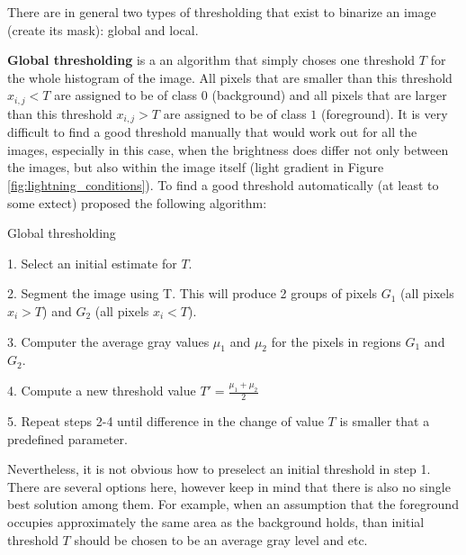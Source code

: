 There are in general two types of thresholding that exist to binarize an image (create its mask): global and local.

\textbf{Global thresholding} is a an algorithm that simply choses one threshold $T$ for the whole histogram of the image. All pixels that are smaller than this threshold $x_{i,j} < T$ are assigned to be of class $0$ (background) and all pixels that are larger than this threshold $x_{i,j} > T$ are assigned to be of class $1$ (foreground). It is very difficult to find a good threshold manually that would work out for all the images, especially in this case, when the brightness does differ not only between the images, but also within the image itself (light gradient in Figure \ref{fig:lightning_conditions}). To find a good threshold automatically (at least to some extect) \cite{digital_image_book} proposed the following algorithm:

\begin{algorithm}[H]
  \caption{Global thresholding}
  \begin{algorithmic}
    \item 1. Select an initial estimate for $T$.
    \item 2. Segment the image using T. This will produce 2 groups of pixels $G_1$ (all pixels $x_i > T$) and $G_2$ (all pixels $x_i < T$).  
    \item 3. Computer the average gray values $\mu_1$ and $\mu_2$ for the pixels in  regions $G_1$ and $G_2$.
    \item 4. Compute a new threshold value 
        $T' = \frac{\mu_1 + \mu_2}{2}$
    \item 5. Repeat steps 2-4 until difference in the change of value $T$ is smaller that a predefined parameter.
  \end{algorithmic}
  \label{alg:global-thresholding}
\end{algorithm}

Nevertheless, it is not obvious how to preselect an initial threshold in step 1. There are several options here, however keep in mind that there is also no single best solution among them. For example, when an assumption that the foreground occupies approximately the same area as the background holds, than initial threshold $T$ should be chosen to be an average gray level and etc.

